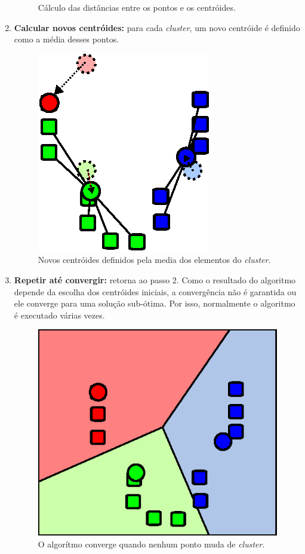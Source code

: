 \begin{enumerate}
\begin{figure}[h]
    \caption{Cálculo das distâncias entre os pontos e os centróides.}
  \end{figure}
  \item \textbf{Calcular novos centróides:} para cada \textit{cluster}, um novo centróide é definido como a média desses pontos.
  \begin{figure}[h]
    \centering
    \includegraphics[scale=0.6]{figuras/kmeans-3.eps}
    \caption{Novos centróides definidos pela media dos elementos do \textit{cluster}.}
  \end{figure}
  \item \textbf{Repetir até convergir:} retorna ao passo 2. Como o resultado do algoritmo depende da escolha dos centróides iniciais, a convergência não é garantida ou ele converge para uma solução sub-ótima. Por isso, normalmente o algoritmo é executado várias vezes.
  \begin{figure}[h]
    \centering
    \includegraphics[scale=0.6]{figuras/kmeans-4.eps}
    \caption{O algorítmo converge quando nenhum ponto muda de \textit{cluster}.}
  \end{figure}
\end{enumerate}

